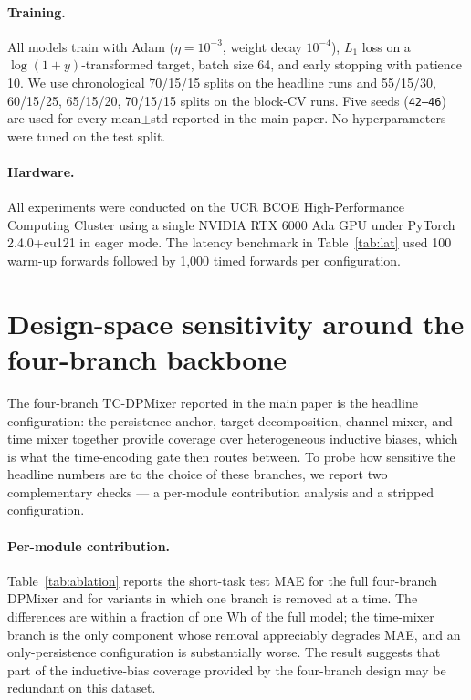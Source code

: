 \documentclass{article}
\begin{document}
\paragraph{Training.}
All models train with Adam ($\eta=10^{-3}$, weight decay $10^{-4}$),
$L_1$ loss on a $\log(1+y)$-transformed target, batch size 64, and
early stopping with patience 10. We use chronological 70/15/15 splits
on the headline runs and 55/15/30, 60/15/25, 65/15/20, 70/15/15 splits
on the block-CV runs. Five seeds (\texttt{42--46}) are used for every
mean$\pm$std reported in the main paper. No hyperparameters were
tuned on the test split.


\paragraph{Hardware.}
All experiments were conducted on the UCR BCOE High-Performance
Computing Cluster using a single NVIDIA RTX 6000 Ada GPU under
PyTorch 2.4.0+cu121 in eager mode. The latency benchmark in
Table~\ref{tab:lat} used 100 warm-up forwards followed by
1{,}000 timed forwards per configuration.


\section{Design-space sensitivity around the four-branch backbone}
\label{si:minimal}

The four-branch TC-DPMixer reported in the main paper is the
headline configuration: the persistence anchor, target decomposition,
channel mixer, and time mixer together provide coverage over
heterogeneous inductive biases, which is what the time-encoding gate
then routes between. To probe how sensitive the headline numbers are to
the choice of these branches, we report two complementary checks ---
a per-module contribution analysis and a stripped configuration.

\paragraph{Per-module contribution.}
Table~\ref{tab:ablation} reports the short-task test MAE for the full
four-branch DPMixer and for variants in which one branch is removed
at a time. The differences are within a fraction of one Wh of the
full model; the time-mixer branch is the only component whose removal
appreciably degrades MAE, and an only-persistence configuration is
substantially worse. The result suggests that part of the
inductive-bias coverage provided by the four-branch design may be
redundant on this dataset.
\end{document}
